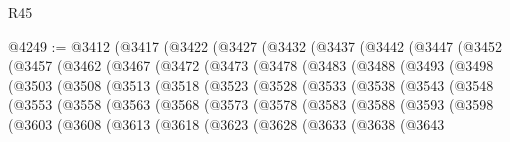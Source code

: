 \begin{lexlean}{R45}
\begin{coremodule}
{@4249 := @3412
    (@3417
      (@3422
        (@3427
          (@3432
            (@3437
              (@3442
                (@3447
                  (@3452
                    (@3457
                      (@3462
                        (@3467
                          (@3472
                            (@3473
                              (@3478
                                (@3483
                                  (@3488
                                    (@3493
                                      (@3498
                                        (@3503
                                          (@3508
                                            (@3513
                                              (@3518
                                                (@3523
                                                  (@3528
                                                    (@3533
                                                      (@3538
                                                        (@3543
                                                          (@3548
                                                            (@3553
                                                              (@3558
                                                                (@3563
                                                                  (@3568
                                                                    (@3573
                                                                      (@3578
                                                                        (@3583
                                                                          (@3588
                                                                            (@3593
                                                                              (@3598
                                                                                (@3603
                                                                                  (@3608
                                                                                    (@3613
                                                                                      (@3618
                                                                                        (@3623
                                                                                          (@3628
                                                                                            (@3633
                                                                                              (@3638
                                                                                                (@3643
}
\end{coremodule}
\end{lexlean}
